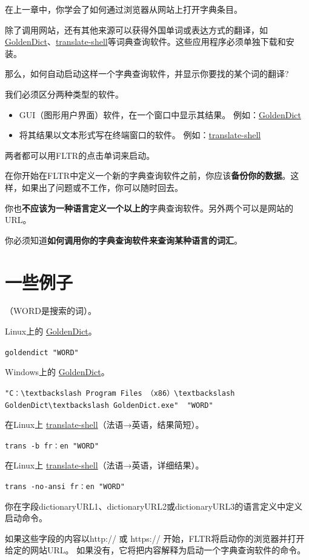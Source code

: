 \documentclass[cn,10pt,math=newtx,citestyle=gb7714-2015,bibstyle=gb7714-2015]{elegantbook}
\newcommand{\goldendict}{\href{http://goldendict.org/}{GoldenDict}}
\newcommand{\translateshell}{\href{https://github.com/soimort/translate-shell}{translate-shell}}
\begin{document}
在上一章中，你学会了如何通过浏览器从网站上打开字典条目。

除了调用网站，还有其他来源可以获得外国单词或表达方式的翻译，如 \goldendict、\translateshell 等词典查询软件。这些应用程序必须单独下载和安装。

那么，如何自动启动这样一个字典查询软件，并显示你要找的某个词的翻译?

我们必须区分两种类型的软件。

\begin{itemize}
    \item  GUI（图形用户界面）软件，在一个窗口中显示其结果。
例如：\goldendict
    \item 将其结果以文本形式写在终端窗口的软件。
例如：\href{https://github.com/soimort/translate-shell}{translate-shell}
\end{itemize}
 
两者都可以用FLTR的点击单词来启动。

在你开始在FLTR中定义一个新的字典查询软件之前，你应该\textbf{备份你的数据}。这样，如果出了问题或不工作，你可以随时回去。

你也\textbf{不应该为一种语言定义一个以上的}字典查询软件。另外两个可以是网站的URL。

你必须知道\textbf{如何调用你的字典查询软件来查询某种语言的词汇}。


\section*{一些例子}（WORD是搜索的词）。

Linux上的 \goldendict。

\lstinline{goldendict "WORD"}

Windows上的 \goldendict。

\lstinline{"C：\textbackslash Program Files （x86）\textbackslash GoldenDict\textbackslash GoldenDict.exe"  "WORD"}

在Linux上 \translateshell （法语→英语，结果简短）。


\lstinline{trans -b fr：en "WORD"}


在Linux上 \translateshell （法语→英语，详细结果）。


\lstinline{trans -no-ansi fr：en "WORD"}


你在字段dictionaryURL1、dictionaryURL2或dictionaryURL3的语言定义中定义启动命令。

如果这些字段的内容以http:// 或 https:// 开始，FLTR将启动你的浏览器并打开给定的网站URL。
如果没有，它将把内容解释为启动一个字典查询软件的命令。
\end{document}
